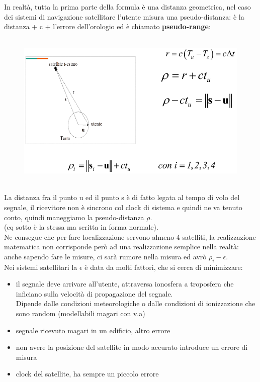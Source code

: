 \documentclass[oneside, 12pt]{extbook}
\begin{document}
In realtà, tutta la prima parte della formula è una distanza geometrica, nel caso dei sistemi di navigazione satellitare l'utente misura una pseudo-distanza: è la distanza + c + l'errore dell'orologio ed è chiamato \textbf{pseudo-range}:\\\\
\begin{figure}[!h]
	\includegraphics[scale=0.3]{immagini/localization/pseudo-range.png}
\end{figure}\\
La distanza fra il punto u ed il punto s è di fatto legata al tempo di volo del segnale, il ricevitore non è sincrono col clock di sistema e quindi ne va tenuto conto, quindi maneggiamo la pseudo-distanza $\rho$.\\
(eq sotto è la stessa ma scritta in forma normale).\\
Ne consegue che per fare localizzazione servono almeno 4 satelliti, la realizzazione matematica non corrisponde però ad una realizzazione semplice nella realtà: anche sapendo fare le misure, ci sarà rumore nella misura ed avrò $\rho_i - \epsilon$.\\
Nei sistemi satellitari la $\epsilon$ è data da molti fattori, che si cerca di minimizzare:
\begin{itemize}
	\item il segnale deve arrivare all'utente, attraversa ionosfera a troposfera che inficiano sulla velocità di propagazione del segnale.\\
	Dipende dalle condizioni meteorologiche o dalle condizioni di ionizzazione che sono random (modellabili magari con v.a)
	\item segnale ricevuto magari in un edificio, altro errore
	\item non avere la posizione del satellite in modo accurato introduce un errore di misura
	\item clock del satellite, ha sempre un piccolo errore
\end{itemize}
\end{document}
